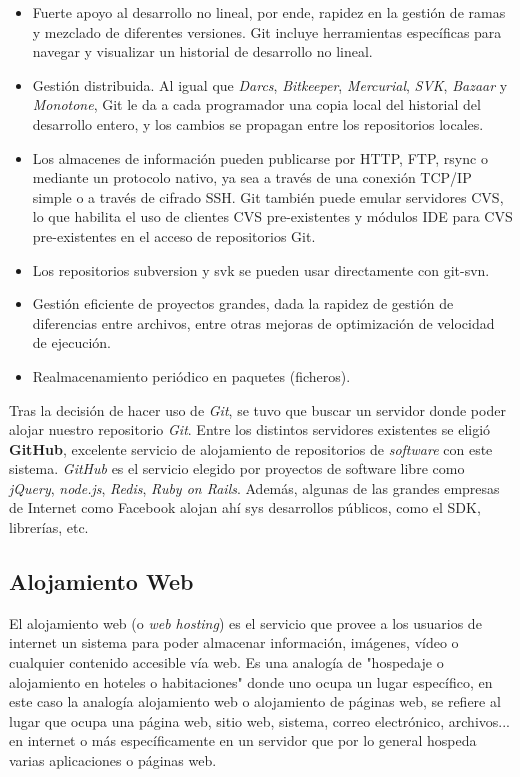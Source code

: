 \begin{itemize}

\item Fuerte apoyo al desarrollo no lineal, por ende, rapidez en la gesti\'on de ramas y mezclado de diferentes versiones. Git incluye herramientas espec\'ificas para navegar y visualizar un historial de desarrollo no lineal.
\item Gesti\'on distribuida. Al igual que \textit{Darcs}, \textit{Bitkeeper}, \textit{Mercurial}, \textit{SVK}, \textit{Bazaar} y \textit{Monotone}, Git le da a cada programador una copia local del historial del desarrollo entero, y los cambios se propagan entre los repositorios locales. 
\item Los almacenes de informaci\'on pueden publicarse por HTTP, FTP, rsync o mediante un protocolo nativo, ya sea a trav\'es de una conexi\'on TCP/IP simple o a trav\'es de cifrado SSH. Git tambi\'en puede emular servidores CVS, lo que habilita el uso de clientes CVS pre-existentes y m\'odulos IDE para CVS pre-existentes en el acceso de repositorios Git.
\item Los repositorios subversion y svk se pueden usar directamente con git-svn.
\item Gesti\'on eficiente de proyectos grandes, dada la rapidez de gesti\'on de diferencias entre archivos, entre otras mejoras de optimizaci\'on de velocidad de ejecuci\'on.
\item Realmacenamiento peri\'odico en paquetes (ficheros).

\end{itemize}

Tras la decisi\'on de hacer uso de \textit{Git}, se tuvo que buscar un servidor donde poder alojar nuestro repositorio \textit{Git}. Entre los distintos servidores existentes se eligi\'o \textbf{GitHub}, excelente servicio de alojamiento de repositorios de \textit{software} con este sistema. \textit{GitHub} es el servicio elegido por proyectos de software libre como \textit{jQuery}, \textit{node.js}, \textit{Redis}, \textit{Ruby on Rails}. Adem\'as, algunas de las grandes empresas de Internet como Facebook alojan ah\'i sys desarrollos p\'ublicos, como el SDK, librer\'ias, etc.

\subsection{Alojamiento Web}
El alojamiento web (o \textit{web hosting}) es el servicio que provee a los usuarios de internet un sistema para poder almacenar informaci\'on, im\'agenes, v\'ideo o cualquier contenido accesible v\'ia web. Es una analog\'ia de "hospedaje o alojamiento en hoteles o habitaciones" donde uno ocupa un lugar espec\'ifico, en este caso la analog\'ia alojamiento web o alojamiento de p\'aginas web, se refiere al lugar que ocupa una p\'agina web, sitio web, sistema, correo electr\'onico, archivos... en internet o m\'as espec\'ificamente en un servidor que por lo general hospeda varias aplicaciones o p\'aginas web.\\

